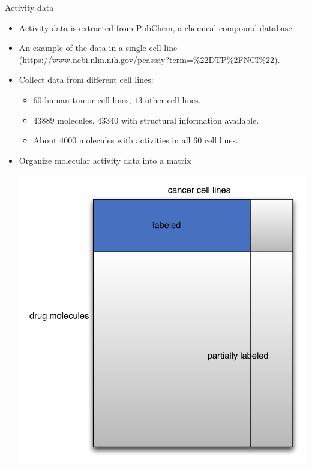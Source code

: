 \documentclass[first=dgreen,second=purple,logo=yellowexc]{aaltoslides}
\begin{document}
{\begin{frame}{Activity data}
	\begin{itemize}
		\item Activity data is extracted from PubChem, a chemical compound database.
		\item An example of the data in a single cell line (\url{https://www.ncbi.nlm.nih.gov/pcassay?term=\%22DTP\%2FNCI\%22}).
		\item Collect data from different cell lines:
		\begin{itemize}
			\footnotesize
			\item $60$ human tumor cell lines, $13$ other cell lines.
			\item $43889$ molecules, $43340$ with structural information available.
			\item About $4000$ molecules with activities in all $60$ cell lines.
		\end{itemize}
		\item Organize molecular activity data into a matrix
		\begin{center}
			\includegraphics[scale=0.25]{./figures/datamatrix.pdf}
		\end{center}
	\end{itemize}
\end{frame}

}
\end{document}
